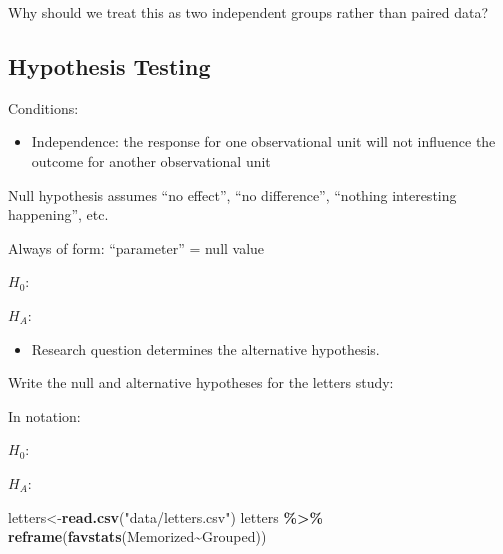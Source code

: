 \documentclass[
]{report}
\newenvironment{Shaded}{\begin{snugshade}}{\end{snugshade}}
\newcommand{\FunctionTok}[1]{\textcolor[rgb]{0.13,0.29,0.53}{\textbf{#1}}}
\newcommand{\NormalTok}[1]{#1}
\newcommand{\OtherTok}[1]{\textcolor[rgb]{0.56,0.35,0.01}{#1}}
\newcommand{\SpecialCharTok}[1]{\textcolor[rgb]{0.81,0.36,0.00}{\textbf{#1}}}
\newcommand{\StringTok}[1]{\textcolor[rgb]{0.31,0.60,0.02}{#1}}
\providecommand{\tightlist}{%
  \setlength{\itemsep}{0pt}\setlength{\parskip}{0pt}}
\newcommand{\rgi}{\hspace{24pt}}  %
\begin{document}

Why should we treat this as two independent groups rather than paired data?

\vspace{0.6in}

\subsection*{Hypothesis Testing}\label{hypothesis-testing-1}

Conditions:

\begin{itemize}
\tightlist
\item
  Independence: the response for one observational unit will not influence the outcome for another observational unit
\end{itemize}

Null hypothesis assumes ``no effect'', ``no difference'', ``nothing interesting happening'', etc.

\rgi Always of form: ``parameter'' = null value

\(H_0:\)

\vspace{0.5in}

\(H_A:\)

\vspace{0.5in}

\begin{itemize}
\tightlist
\item
  Research question determines the alternative hypothesis.
\end{itemize}

Write the null and alternative hypotheses for the letters study:

In notation:

\(H_0:\)

\vspace{0.2in}

\(H_A:\)

\vspace{0.2in}

\begin{Shaded}
\begin{Highlighting}[]
\NormalTok{letters}\OtherTok{\textless{}{-}}\FunctionTok{read.csv}\NormalTok{(}\StringTok{"data/letters.csv"}\NormalTok{)}
\NormalTok{letters }\SpecialCharTok{\%\textgreater{}\%}
    \FunctionTok{reframe}\NormalTok{(}\FunctionTok{favstats}\NormalTok{(Memorized}\SpecialCharTok{\textasciitilde{}}\NormalTok{Grouped))}
\end{Highlighting}
\end{Shaded}
\end{document}
